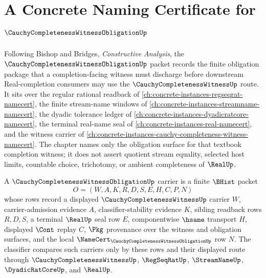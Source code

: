 \chapter{A Concrete Naming Certificate for $\CauchyCompletenessWitnessObligationUp$}
\label{ch:concrete-instances-cauchy-completeness-witness-obligation-namecert}

Following Bishop and Bridges, \emph{Constructive Analysis}, the $\CauchyCompletenessWitnessObligationUp$ packet records the finite obligation package that a completion-facing witness must discharge before downstream Real-completion consumers may use the $\CauchyCompletenessWitnessUp$ route. It sits over the regular rational readback of \autoref{ch:concrete-instances-regseqrat-namecert}, the finite stream-name windows of \autoref{ch:concrete-instances-streamname-namecert}, the dyadic tolerance ledger of \autoref{ch:concrete-instances-dyadicratcore-namecert}, the terminal real-name seal of \autoref{ch:concrete-instances-real-namecert}, and the witness carrier of \autoref{ch:concrete-instances-cauchy-completeness-witness-namecert}. The chapter names only the obligation surface for that textbook completion witness; it does not assert quotient stream equality, selected host limits, countable choice, trichotomy, or ambient completeness of $\RealUp$.

\begin{definition}
\label{def:cauchy-completeness-witness-obligation-carrier}
A $\CauchyCompletenessWitnessObligationUp$ carrier is a finite $\BHist$ packet
$$
O=(W,A,K,R,D,S,E,H,C,P,N)
$$
whose rows record a displayed $\CauchyCompletenessWitnessUp$ carrier $W$, carrier-admission evidence $A$, classifier-stability evidence $K$, sibling readback rows $R,D,S$, a terminal $\RealUp$ seal row $E$, componentwise $\hsame$ transport $H$, displayed $\Cont$ replay $C$, $\Pkg$ provenance over the witness and obligation surfaces, and the local $\NameCert_{\CauchyCompletenessWitnessObligationUp}$ row $N$. The classifier compares such carriers only by these rows and their displayed route through $\CauchyCompletenessWitnessUp$, $\RegSeqRatUp$, $\StreamNameUp$, $\DyadicRatCoreUp$, and $\RealUp$.
\end{definition}


